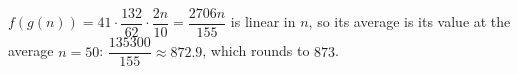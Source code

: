 $f(g(n))=41\cdot\dfrac{132}{62}\cdot\dfrac{2n}{10}=\dfrac{2706n}{155}$ is linear in $n$, so its average is its value at the average $n=50$: $\dfrac{135300}{155}\approx872.9$, which rounds to $\boxed{873}$.
